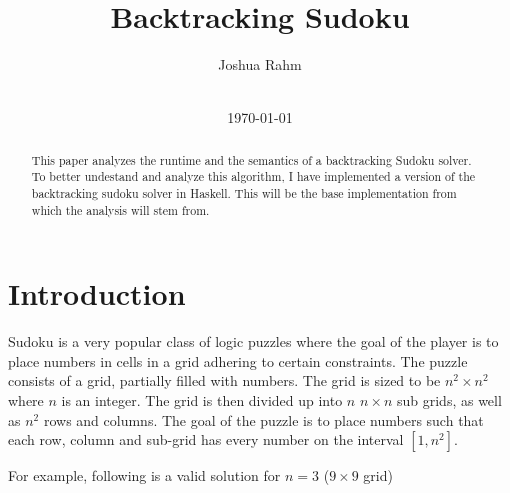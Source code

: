 \documentclass{sig-alternate-05-2015}
\begin{document}
\title{Backtracking Sudoku}
\newcommand{\sep}{\vspace{1cm}}

%
\author{
\alignauthor
Joshua Rahm\\
       \\
}
\date{\today}

\newcommand\citationneeded{${}^{\text{<citation\_needed>}}$}

\maketitle
\begin{abstract}
    This paper analyzes the runtime and the semantics of
    a backtracking Sudoku solver. To better undestand
    and analyze this algorithm, I have implemented
    a version of the backtracking sudoku solver in
    Haskell. This will be the base implementation from
    which the analysis will stem from.
\end{abstract}

\section{Introduction}

Sudoku is a very popular class of logic puzzles where the goal of the player is
to place numbers in cells in a grid adhering to certain constraints. The puzzle
consists of a grid, partially filled with numbers.  The grid is sized to be
$n^2\times n^2$ where $n$ is an integer. The grid is then divided up into $n$
$n\times n$ sub grids, as well as $n^2$ rows and columns. The goal of the
puzzle is to place numbers such that each row, column and sub-grid has every
number on the interval $[1, n^2]$.

For example, following is a valid solution for $n=3$ ($9\times 9$ grid)
\end{document}
